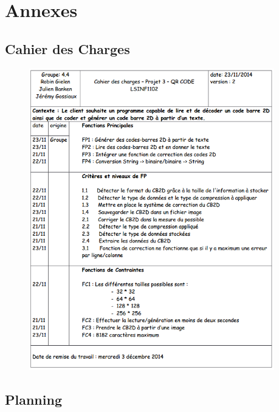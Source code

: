 \newpage

\section{Annexes}


\subsection{Cahier des Charges}

\begin{figure}[!h]
	\centering
	\includegraphics[width=0.95\textwidth]{images/CahierDesCharges.png}
	\label{Cahier des charges}
\end{figure}

\newpage

\subsection{Planning}

